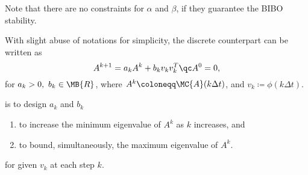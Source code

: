 \documentclass[nobib]{my-handout}
\theoremstyle{definition}
\theoremstyle{remark}
\begin{document}
Note that there are no constraints for $\alpha$ and $\beta$, if they guarantee
the BIBO stability.

With slight abuse of notations for simplicity, the discrete counterpart can be
written as
\begin{equation}\label{eq:discrete_update_law}
	A^{k+1} = a_k A^k + b_k v_k v_k^T \qc A^0 = 0,
\end{equation}
for $a_k > 0,\ b_k \in \MB{R}$, where $A^k \coloneqq \MC{A}(k \Delta t)$, and $v_k
\coloneqq \phi(k \Delta t)$.

 is to design $a_k$ and $b_k$
\begin{enumerate}
	\item to increase the minimum eigenvalue of $A^k$ as $k$ increases, and
	\item to bound, simultaneously, the maximum eigenvalue of $A^k$.
\end{enumerate}
for given $v_k$ at each step $k$.
\end{document}
